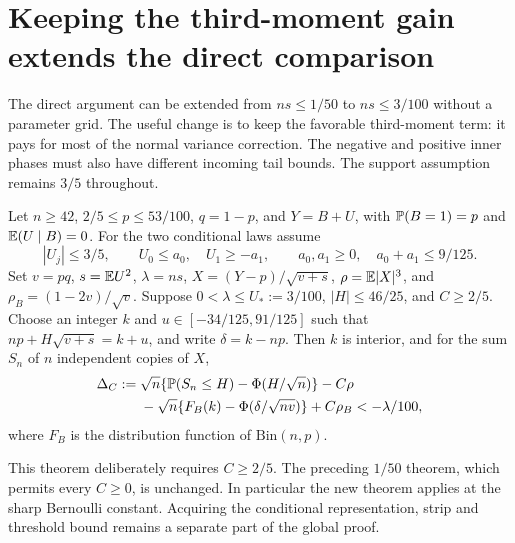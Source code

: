 \section{Keeping the third-moment gain extends the direct comparison}
\label{v11:counts}

The direct argument can be extended from $ns\le1/50$ to $ns\le3/100$
without a parameter grid. The useful change is to keep the favorable
third-moment term: it pays for most of the normal variance correction.
The negative and positive inner phases must also have different incoming
tail bounds. The support assumption remains $3/5$ throughout.

\begin{theorem}\label{v11:counts:theorem}
Let $n\ge42$, $2/5\le p\le53/100$, $q=1-p$, and $Y=B+U$, with
$\mathbb P(B=1)=p$ and $\mathbb E(U\mid B)=0$. For the two conditional laws assume
\[
 |U_j|\le3/5,\qquad U_0\le a_0,\quad U_1\ge-a_1,
 \qquad a_0,a_1\ge0,\quad a_0+a_1\le9/125.
\]
Set $v=pq$, $s=\mathbb E U^2$, $\lambda=ns$, $X=(Y-p)/\sqrt{v+s}$,
$\rho=\mathbb E|X|^3$, and $\rho_B=(1-2v)/\sqrt v$. Suppose
$0<\lambda\le U_*:=3/100$, $|H|\le46/25$, and $C\ge2/5$.
Choose an integer $k$ and $u\in[-34/125,91/125]$ such that
$np+H\sqrt{v+s}=k+u$, and write $\delta=k-np$.
Then $k$ is interior, and for the sum $S_n$ of $n$ independent copies
of $X$,
\begin{align*}
 \Delta_C:={}&\sqrt n\{\mathbb P(S_n\le H)-\Phi(H/\sqrt n)\}-C\rho\\
 &-\sqrt n\{F_B(k)-\Phi(\delta/\sqrt{nv})\}+C\rho_B
                                      <-\lambda/100,
\end{align*}
where $F_B$ is the distribution function of $\mathrm{Bin}(n,p)$.
\end{theorem}

This theorem deliberately requires $C\ge2/5$. The preceding $1/50$
theorem, which permits every $C\ge0$, is unchanged. In particular the
new theorem applies at the sharp Bernoulli constant. Acquiring the
conditional representation, strip and threshold bound remains a
separate part of the global proof.

